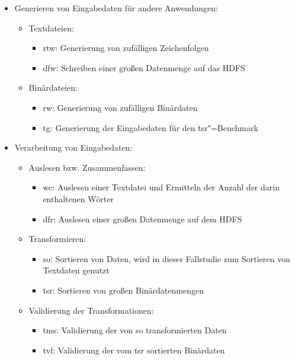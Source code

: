 \begin{itemize}
    \item Generieren von Eingabedaten für andere Anwendungen:
    \begin{itemize}
        \item Textdateien:
        \begin{itemize}
            \item \gls{rtw}: Generierung von zufälligen Zeichenfolgen
            \item \gls{dfw}: Schreiben einer großen Datenmenge auf das HDFS
        \end{itemize}
        \item Binärdateien:
        \begin{itemize}
            \item \gls{rw}: Generierung von zufälligen Binärdaten
            \item \gls{tg}: Generierung der Eingabedaten für den \acrlong{tsr}"=Benchmark
       \end{itemize}
    \end{itemize}

    \item Verarbeitung von Eingabedaten:
    \begin{itemize}
        \item Auslesen bzw. Zusammenfassen:
        \begin{itemize}
            \item \gls{wc}: Auslesen einer Textdatei und Ermitteln der Anzahl der darin enthaltenen Wörter
            \item \gls{dfr}: Auslesen einer großen Datenmenge auf dem HDFS
        \end{itemize}
        \item Transformieren:
        \begin{itemize}
            \item \gls{so}: Sortieren von Daten, wird in dieser Fallstudie zum Sortieren von Textdaten genutzt
            \item \gls{tsr}: Sortieren von großen Binärdatenmengen
        \end{itemize}
        \item Validierung der Transformationen:
        \begin{itemize}
            \item \gls{tms}: Validierung der von \acrlong{so} transformierten Daten
            \item \gls{tvl}: Validierung der vom \acrlong{tsr} sortierten Binärdaten
        \end{itemize}
    \end{itemize}


\end{itemize}
